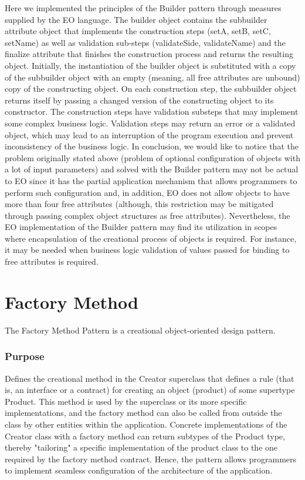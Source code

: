 \documentclass[12pt]{book}
\begin{document}
Here we implemented the principles of the Builder pattern through measures supplied by the EO language. The builder object contains the subbuilder attribute object that implements the construction steps (setA, setB, setC, setName) as well as validation sub-steps (validateSide, validateName) and the finalize attribute that finishes the construction process and returns the resulting object. Initially, the instantiation of the builder object is substituted with a copy of the subbuilder object with an empty (meaning, all free attributes are unbound) copy of the constructing object. On each construction step, the subbuilder object returns itself by passing a changed version of the constructing object to its constructor. The construction steps have validation substeps that may implement some complex business logic. Validation steps may return an error or a validated object, which may lead to an interruption of the program execution and prevent inconsistency of the business logic.
In conclusion, we would like to notice that the problem originally stated above (problem of optional configuration of objects with a lot of input parameters) and solved with the Builder pattern may not be actual to EO since it has the partial application mechanism that allows programmers to perform such configuration and, in addition, EO does not allow objects to have more than four free attributes (although, this restriction may be mitigated through passing complex object structures as free attributes). Nevertheless, the EO implementation of the Builder pattern may find its utilization in scopes where encapsulation of the creational process of objects is required. For instance, it may be needed when business logic validation of values passed for binding to free attributes is required.


\section{Factory Method}
The Factory Method Pattern is a creational object-oriented design pattern.

\subsubsection{Purpose}
Defines the creational method in the Creator superclass that defines a rule (that is, an interface or a contract) for creating an object (product) of some supertype Product. This method is used by the superclass or its more specific implementations, and the factory method can also be called from outside the class by other entities within the application. Concrete implementations of the Creator class with a factory method can return subtypes of the Product type, thereby "tailoring" a specific implementation of the product class to the one required by the factory method contract. Hence, the pattern allows programmers to implement seamless configuration of the architecture of the application.
\end{document}
